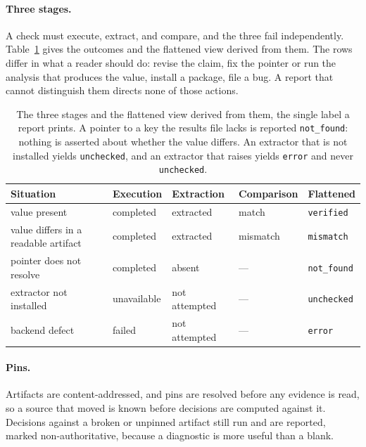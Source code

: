\documentclass{article}
\newcommand{\code}[1]{\texttt{#1}}
\begin{document}
\paragraph{Three stages.} A check must execute, extract, and compare, and the three fail
independently. Table~\ref{tab:stages} gives the outcomes and the flattened view derived from them.
The rows differ in what a reader should do: revise the claim, fix the pointer or run the analysis
that produces the value, install a package, file a bug. A report that cannot distinguish them
directs none of those actions.

\begin{table}[h]
\centering
\small
\caption{The three stages and the flattened view derived from them, the single label a report
prints. A pointer to a key the results file lacks is reported \code{not\_found}: nothing is
asserted about whether the value differs. An extractor that is not installed yields
\code{unchecked}, and an extractor that raises yields \code{error} and never \code{unchecked}.}
\label{tab:stages}
\begin{tabular}{@{}>{\raggedright\arraybackslash}p{}lll>{\raggedright\arraybackslash}p{}@{}}
\toprule
\textbf{Situation} & \textbf{Execution} & \textbf{Extraction} & \textbf{Comparison} & \textbf{Flattened} \\
\midrule
value present & completed & extracted & match & \code{verified} \\
value differs in a readable artifact & completed & extracted & mismatch & \code{mismatch} \\
pointer does not resolve & completed & absent & --- & \code{not\_found} \\
extractor not installed & unavailable & not attempted & --- & \code{unchecked} \\
backend defect & failed & not attempted & --- & \code{error} \\
\bottomrule
\end{tabular}
\end{table}

\paragraph{Pins.} Artifacts are content-addressed, and pins are resolved before any evidence is
read, so a source that moved is known before decisions are computed against it. Decisions against
a broken or unpinned artifact still run and are reported, marked non-authoritative, because a
diagnostic is more useful than a blank.
\end{document}
